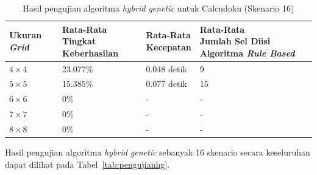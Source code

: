 \begin{enumerate}
\begin{table}
\centering
\captionsetup{justification=centering}
\caption[Hasil pengujian algoritma \textit{hybrid genetic} untuk Calcudoku (Skenario 16)]{Hasil pengujian algoritma \textit{hybrid genetic} untuk Calcudoku (Skenario 16)}
\begin{tabular}{| l | l | l | l |}
\hline
Ukuran \textit{Grid} & \makecell[c]{Rata-Rata \\ Tingkat Keberhasilan} & \makecell[c]{Rata-Rata \\ Kecepatan} & \makecell[c]{Rata-Rata \\ Jumlah Sel Diisi Algoritma \textit{Rule Based}} \\
\hline \hline
\begin{math}4 \times 4\end{math} & 23.077\% & 0.048 detik & 9 \\
\hline
\begin{math}5 \times 5\end{math} & 15.385\% & 0.077 detik & 15 \\
\hline
\begin{math}6 \times 6\end{math} & 0\% & - & - \\
\hline
\begin{math}7 \times 7\end{math} & 0\% & - & - \\
\hline
\begin{math}8 \times 8\end{math} & 0\% & - & - \\
\hline
\end{tabular}
\label{tab:pengujianhg16}
\end{table}

\end{enumerate}

Hasil pengujian algoritma \textit{hybrid genetic} sebanyak 16 skenario secara keseluruhan dapat dilihat pada Tabel~\ref{tab:pengujianhg}.


